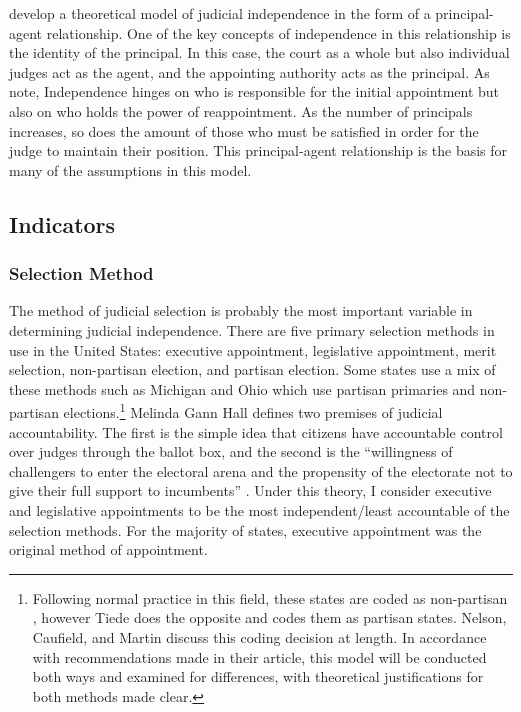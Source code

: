 \documentclass[12pt]{article}
\begin{document}
\citet*{Choi2010} develop a theoretical model of judicial independence in the form of a principal-agent relationship.  One of the key concepts of independence in this relationship is the identity of the principal.  In this case, the court as a whole but also individual judges act as the agent, and the appointing authority acts as the principal.  As \citeauthor{Choi2010} note, Independence hinges on who is responsible for the initial appointment but also on who holds the power of reappointment.  As the number of principals increases, so does the amount of those who must be satisfied in order for the judge to maintain their position.  This principal-agent relationship is the basis for many of the assumptions in this model.

\subsection*{Indicators}
\subsubsection*{Selection Method}
The method of judicial selection is probably the most important variable in determining judicial independence. There are five primary selection methods in use in the United States: executive appointment, legislative appointment, merit selection, non-partisan election, and partisan election. Some states use a mix of these methods such as Michigan and Ohio which use partisan primaries and non-partisan elections.\footnote{Following normal practice in this field, these states are coded as non-partisan \citep{Canes-Wrone2012, Caldarone2009}, however Tiede \citeyearpar{Tiede2006} does the opposite and codes them as partisan states. Nelson, Caufield, and Martin \citeyearpar{Nelson2013} discuss this coding decision at length.  In accordance with recommendations made in their article, this model will be conducted both ways and examined for differences, with theoretical justifications for both methods made clear.  }  Melinda Gann Hall \citeyearpar{Hall2007} defines two premises of judicial accountability. The first is the simple idea that citizens have accountable control over judges through the ballot box, and the second is the ``willingness of challengers to enter the electoral arena and the propensity of the electorate not to give their full support to incumbents'' \citep{Hall2007}.  Under this theory, I consider executive and legislative appointments to be the most independent/least accountable of the selection methods.  For the majority of states, executive appointment was the original method of appointment.  
\end{document}

